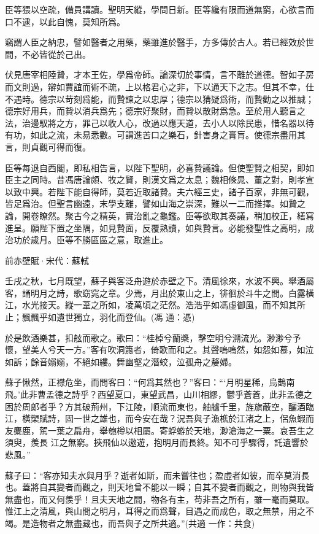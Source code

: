 \documentclass[12pt,a4paper]{ctexbook}
\begin{document}
臣等猥以空疏，備員講讀。聖明天縱，學問日新。臣等纔有限而道無窮，心欲言而口不逮，以此自愧，莫知所爲。\par
竊謂人臣之納忠，譬如醫者之用藥，藥雖進於醫手，方多傳於古人。若已經效於世間，不必皆從於己出。\par
伏見唐宰相陸贄，才本王佐，學爲帝師。論深切於事情，言不離於道德。智如子房而文則過，辯如賈誼而術不疏，上以格君心之非，下以通天下之志。但其不幸，仕不遇時。德宗以苛刻爲能，而贄諫之以忠厚；德宗以猜疑爲術，而贄勸之以推誠；德宗好用兵，而贄以消兵爲先；德宗好聚財，而贄以散財爲急。至於用人聽言之法，治邊馭將之方，罪己以收人心，改過以應天道，去小人以除民患，惜名器以待有功，如此之流，未易悉數。可謂進苦口之樂石，針害身之膏肓。使德宗盡用其言，則貞觀可得而復。\par
臣等每退自西閣，即私相告言，以陛下聖明，必喜贄議論。但使聖賢之相契，即如臣主之同時。昔馮唐論頗、牧之賢，則漢文爲之太息；魏相條晁、董之對，則孝宣以致中興。若陛下能自得師，莫若近取諸贄。夫六經三史，諸子百家，非無可觀，皆足爲治。但聖言幽遠，末學支離，譬如山海之崇深，難以一二而推擇。如贄之論，開卷瞭然。聚古今之精英，實治亂之龜鑑。臣等欲取其奏議，稍加校正，繕寫進呈。願陛下置之坐隅，如見贄面，反覆熟讀，如與贄言。必能發聖性之高明，成治功於歲月。臣等不勝區區之意，取進止。\par
前赤壁賦·宋代：蘇軾 \par
壬戌之秋，七月既望，蘇子與客泛舟遊於赤壁之下。清風徐來，水波不興。舉酒屬客，誦明月之詩，歌窈窕之章。少焉，月出於東山之上，徘徊於斗牛之間。白露橫江，水光接天。縱一葦之所如，凌萬頃之茫然。浩浩乎如馮虛御風，而不知其所止；飄飄乎如遺世獨立，羽化而登仙。(馮 通：憑)\par
於是飲酒樂甚，扣舷而歌之。歌曰：“桂棹兮蘭槳，擊空明兮溯流光。渺渺兮予懷，望美人兮天一方。”客有吹洞簫者，倚歌而和之。其聲嗚嗚然，如怨如慕，如泣如訴；餘音嫋嫋，不絕如縷。舞幽壑之潛蛟，泣孤舟之嫠婦。\par
蘇子愀然，正襟危坐，而問客曰：“何爲其然也？”客曰：“‘月明星稀，烏鵲南飛。’此非曹孟德之詩乎？西望夏口，東望武昌，山川相繆，鬱乎蒼蒼，此非孟德之困於周郎者乎？方其破荊州，下江陵，順流而東也，舳艫千里，旌旗蔽空，釃酒臨江，橫槊賦詩，固一世之雄也，而今安在哉？況吾與子漁樵於江渚之上，侶魚蝦而友麋鹿，駕一葉之扁舟，舉匏樽以相屬。寄蜉蝣於天地，渺滄海之一粟。哀吾生之須臾，羨長 江之無窮。挾飛仙以遨遊，抱明月而長終。知不可乎驟得，託遺響於悲風。”\par
蘇子曰：“客亦知夫水與月乎？逝者如斯，而未嘗往也；盈虛者如彼，而卒莫消長也。蓋將自其變者而觀之，則天地曾不能以一瞬；自其不變者而觀之，則物與我皆無盡也，而又何羨乎！且夫天地之間，物各有主，苟非吾之所有，雖一毫而莫取。惟江上之清風，與山間之明月，耳得之而爲聲，目遇之而成色，取之無禁，用之不竭。是造物者之無盡藏也，而吾與子之所共適。”(共適 一作：共食)\par
\end{document}
